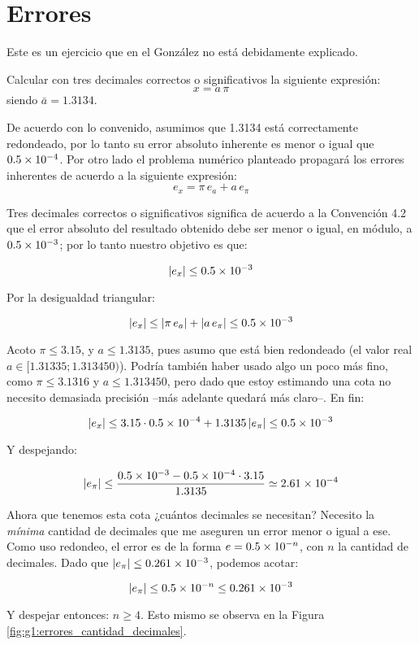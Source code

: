 \section{Errores}

Este es un ejercicio que en el González no está debidamente explicado.

Calcular con tres decimales correctos o significativos la siguiente expresión: $$x=a\, \pi$$ siendo $\bar{a} = 1.3134$.

De acuerdo con lo convenido, asumimos que 1.3134 está correctamente redondeado, por lo tanto su error absoluto inherente es menor o igual que $0.5\times 10^{-4}$.
Por otro lado el problema numérico planteado propagará los errores inherentes de acuerdo a la siguiente expresión:
\[e_x = \pi \, e_{a} + a\, e_{\pi}\]

Tres decimales correctos o significativos significa de acuerdo a la Convención 4.2 que el error absoluto del resultado obtenido debe ser menor o igual, en módulo, a $0.5\times 10^{-3}$; por lo tanto nuestro objetivo es que:

\[ \left| e_x \right| \le 0.5\times 10^{-3} \]

Por la desigualdad triangular:

\[ \left| e_x \right| \le \left| \pi \, e_{a} \right| + \left| a \, e_{\pi}    \right|  \le 0.5\times 10^{-3}  \]

Acoto $\pi \le 3.15$, y $a\le 1.3135$, pues asumo que está bien redondeado (el valor real  $a \in [1.31335; 1.313450)$). Podría también haber usado algo un poco más fino, como $\pi \le 3.1316$ y $a\le 1.313450$, pero dado que estoy estimando una cota no necesito demasiada precisión --más adelante quedará más claro--. En fin:

\[ \left| e_x \right| \le  3.15 \cdot 0.5\times 10^{-4}  +  1.3135\, |e_{\pi}|      \le 0.5\times 10^{-3}  \]

Y despejando: 

\[ \left| e_{\pi} \right| \le  \frac{0.5\times 10^{-3} - 0.5 \times 10^{-4} \cdot 3.15 }{1.3135} \simeq 2.61 \times 10^{-4} \]

Ahora que tenemos esta cota ¿cuántos decimales se necesitan? Necesito la \emph{mínima} cantidad de decimales que me aseguren un error menor o igual a ese. Como uso redondeo, el error es de la forma $e = 0.5\times 10^{-n}$, con $n$ la cantidad de decimales. Dado que $|e_{\pi}| \le 0.261\times 10^{-3}$, podemos acotar:

$$|e_{\pi}| \le 0.5\times 10^{-n} \le 0.261\times 10^{-3}$$

Y despejar entonces: $n\ge4$. Esto mismo se observa en la Figura \ref{fig:g1:errores_cantidad_decimales}.

